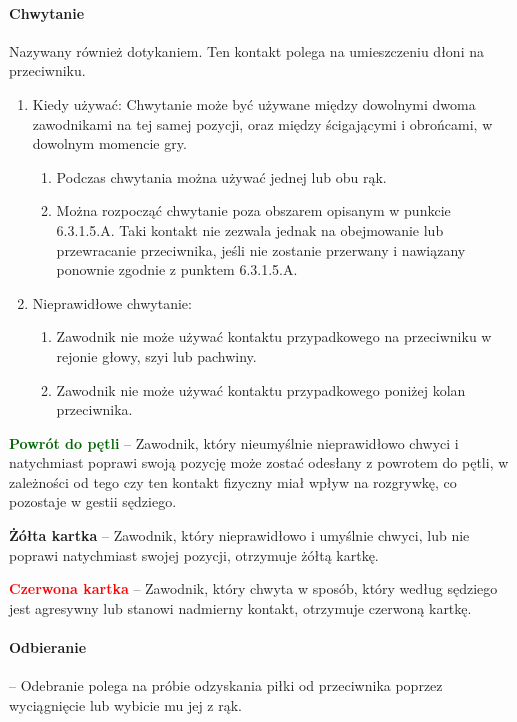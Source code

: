 \documentclass[12pt]{article}
\newcommand\redcard[1]{\bgroup\textcolor{red}{\textbf{#1}}}
\newcommand\yellowcard[1]{\bgroup\textcolor{darkyellow}{\textbf{#1}}}
\newcommand\other[1]{\bgroup\textcolor{darkgreen}{\textbf{#1}}}
\begin{document}
\paragraph{Chwytanie}
Nazywany również dotykaniem. Ten kontakt
polega na umieszczeniu dłoni na przeciwniku.

\begin{enumerate}
	\item
	      Kiedy używać: Chwytanie może być używane między dowolnymi dwoma
	      zawodnikami na tej samej pozycji, oraz między ścigającymi i obrońcami,
	      w dowolnym momencie gry.

	      \begin{enumerate}
		      \item
		            Podczas chwytania można używać jednej lub obu rąk.
		      \item
		            Można rozpocząć chwytanie poza obszarem opisanym w punkcie
		            6.3.1.5.A. Taki kontakt nie zezwala jednak na obejmowanie lub
		            przewracanie przeciwnika, jeśli nie zostanie przerwany i nawiązany
		            ponownie zgodnie z punktem 6.3.1.5.A.
	      \end{enumerate}
	\item
	      Nieprawidłowe chwytanie:

	      \begin{enumerate}
		      \item
		            Zawodnik nie może używać kontaktu przypadkowego na przeciwniku w
		            rejonie głowy, szyi lub pachwiny.
		      \item
		            Zawodnik nie może używać kontaktu przypadkowego poniżej kolan
		            przeciwnika.
	      \end{enumerate}
\end{enumerate}

\other{Powrót do pętli} -- Zawodnik, który nieumyślnie nieprawidłowo
chwyci i natychmiast poprawi swoją pozycję może zostać odesłany z
powrotem do pętli, w zależności od tego czy ten kontakt fizyczny miał
wpływ na rozgrywkę, co pozostaje w gestii sędziego.

\yellowcard{Żółta kartka} -- Zawodnik, który nieprawidłowo i umyślnie chwyci,
lub nie poprawi natychmiast swojej pozycji, otrzymuje żółtą kartkę.

\redcard{Czerwona kartka} -- Zawodnik, który chwyta w sposób, który według
sędziego jest agresywny lub stanowi nadmierny kontakt, otrzymuje
czerwoną kartkę.

\paragraph{Odbieranie} -- Odebranie polega na próbie odzyskania
piłki od przeciwnika poprzez wyciągnięcie lub wybicie mu jej z rąk.
\end{document}
